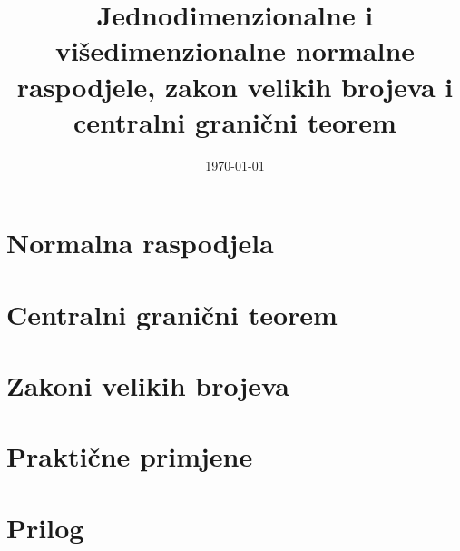 \documentclass[11pt]{article}
\date{\today}
\title{Jednodimenzionalne i višedimenzionalne normalne raspodjele, zakon velikih
brojeva i centralni granični teorem}
\begin{document}
\maketitle
\tableofcontents

\section{Normalna raspodjela}


\section{Centralni granični teorem}


\section{Zakoni velikih brojeva}


\section{Praktične primjene}

\section{Prilog}

\end{document}
